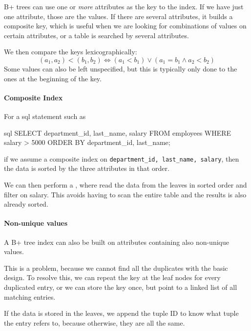 B+ trees can use one or \textit{more} attributes as the key to the index.
If we have just one attribute, those are the values.
If there are several attributes, it builds a composite key, which is useful when we are looking for combinations of values on certain attributes,
or a table is searched by several attributes.

We then compare the keys lexicographically:
\[
    (a_1, a_2) < (b_1, b_2) \Leftrightarrow (a_1 < b_1) \lor (a_1 = b_1 \land a_2 < b_2)
\]
Some values can also be left unspecified, but this is typically only done to the ones at the beginning of the key.

\newpage
\paragraph{Composite Index}
For a \acrshort{sql} statement such as
\begin{code}{sql}
    SELECT department_id, last_name, salary
    FROM employees WHERE salary > 5000
    ORDER BY department_id, last_name;
\end{code}
if we assume a composite index on \texttt{department\_id, last\_name, salary}, then the data is sorted by the three attributes in that order.

We can then perform a , where read the data from the leaves in sorted order and filter on salary.
This avoids having to scan the entire table and the results is also already sorted.


\paragraph{Non-unique values}
A B+ tree index can also be built on attributes containing also non-unique values.

This is a problem, because we cannot find all the duplicates with the basic design. To resolve this, we can repeat the key at the leaf nodes for every duplicated entry,
or we can store the key once, but point to a linked list of all matching entries.

If the data is stored in the leaves, we append the tuple ID to know what tuple the entry refers to, because otherwise, they are all the same.
